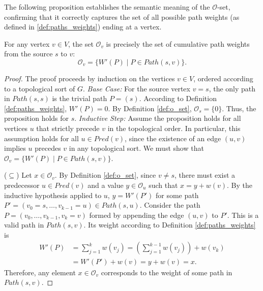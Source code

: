 The following proposition establishes the semantic meaning of the $\mathcal{O}$-set, confirming that it correctly captures the set of all possible path weights (as defined in \ref{def:paths_weights}) ending at a vertex.

\begin{proposition}
    \label{prop:o_set_correctness}
    For any vertex $v \in V$, the set $\mathcal{O}_v$ is precisely the set of cumulative path weights from the source $s$ to $v$:
    \[ \mathcal{O}_v = \{ W'(P) \mid P \in Path(s, v) \}. \]
\end{proposition}
\begin{proof}
    The proof proceeds by induction on the vertices $v \in V$, ordered according to a topological sort of $G$.
    \textit{Base Case:} For the source vertex $v=s$, the only path in $Path(s, s)$ is the trivial path $P=(s)$. According to Definition \ref{def:paths_weights}, $W'(P)=0$. By Definition \ref{def:o_set}, $\mathcal{O}_s = \{0\}$. Thus, the proposition holds for $s$.
    \textit{Inductive Step:} Assume the proposition holds for all vertices $u$ that strictly precede $v$ in the topological order. In particular, this assumption holds for all $u \in Pred(v)$, since the existence of an edge $(u, v)$ implies $u$ precedes $v$ in any topological sort. We must show that $\mathcal{O}_v = \{ W'(P) \mid P \in Path(s, v) \}$.

    ($\subseteq$) Let $x \in \mathcal{O}_v$. By Definition \ref{def:o_set}, since $v \neq s$, there must exist a predecessor $u \in Pred(v)$ and a value $y \in \mathcal{O}_u$ such that $x = y + w(v)$. By the inductive hypothesis applied to $u$, $y = W'(P')$ for some path $P' = (v_0=s, \dots, v_{k-1}=u) \in Path(s, u)$. Consider the path $P = (v_0, \dots, v_{k-1}, v_k=v)$ formed by appending the edge $(u, v)$ to $P'$. This is a valid path in $Path(s, v)$. Its weight according to Definition \ref{def:paths_weights} is
    \begin{align*}
        W'(P) & = \sum_{j=1}^{k} w(v_j) = \left(\sum_{j=1}^{k-1} w(v_j)\right) + w(v_k) \\
              & = W'(P') + w(v) = y + w(v) = x.
    \end{align*}
    Therefore, any element $x \in \mathcal{O}_v$ corresponds to the weight of some path in $Path(s, v)$.


\end{proof}

